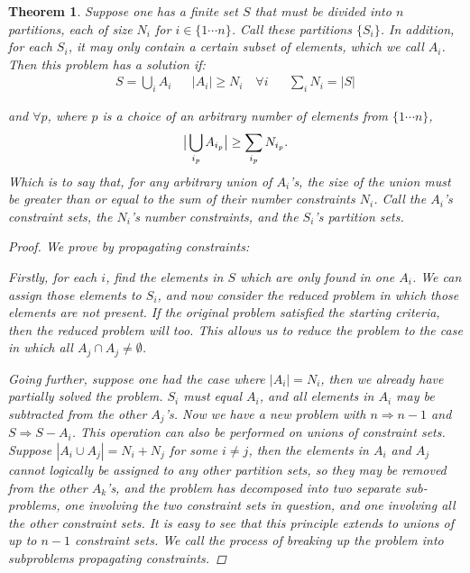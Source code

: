 \documentclass[]{article}
\newtheorem{theorem}{Theorem}
\begin{document}
\begin{theorem}
Suppose one has a finite set $S$ that must be divided into $n$ partitions, each of size $N_i$ for $i \in \{1 \cdots n\}$. Call these partitions $\{S_i\}$. In addition, for each $S_i$, it may only contain a certain subset of elements, which we call $A_i$. Then this problem has a solution if:
\begin{align}\label{first}
S = \bigcup_i A_i && |A_i| \geq N_i \quad \forall i && \sum_i N_i = |S|
\end{align}

and $\forall p $, where $p$ is a choice of an arbitrary number of elements from $\{1 \cdots n\}$,
\begin{equation}\label{second}
\big{|}\bigcup_{i_p} A_{i_p} \big{|} \geq \sum_{i_p} N_{i_p}.
\end{equation}
Which is to say that, for any arbitrary union of $A_i$'s, the size of the union must be greater than or equal to the sum of their number constraints $N_i$. Call the $A_i$'s \textit{constraint sets}, the $N_i$'s \textit{number constraints}, and the $S_i$'s \textit{partition sets}.


\begin{proof}

We prove by propagating constraints:\newline

Firstly, for each $i$, find the elements in $S$ which are only found in one $A_i$. We can assign those elements to $S_i$, and now consider the reduced problem in which those elements are not present. If the original problem satisfied the starting criteria, then the reduced problem will too. This allows us to reduce the problem to the case in which all $A_j \cap A_j \ne \emptyset$. \newline
 
Going further, suppose one had the case where $|A_i| = N_i$, then we already have partially solved the problem. $S_i$ must equal $A_i$, and all elements in $A_i$ may be subtracted from the other $A_j$'s.
Now we have a new problem with $n \Rightarrow n-1$ and $S \Rightarrow S - A_i$.
This operation can also be performed on unions of constraint sets. 
Suppose $|A_i \cup A_j| = N_i + N_j$ for some $i \ne j$, then the elements in $A_i$ and $A_j$ cannot logically be assigned to any other partition sets, so they may be removed from the other $A_k$'s, and the problem has decomposed into two separate sub-problems, one involving the two constraint sets in question, and one involving all the other constraint sets.
It is easy to see that this principle extends to unions of up to $n-1$ constraint sets.
 We call the process of breaking up the problem into subproblems \textit{propagating constraints}. \newline


\end{proof}
\end{theorem}
\end{document}
